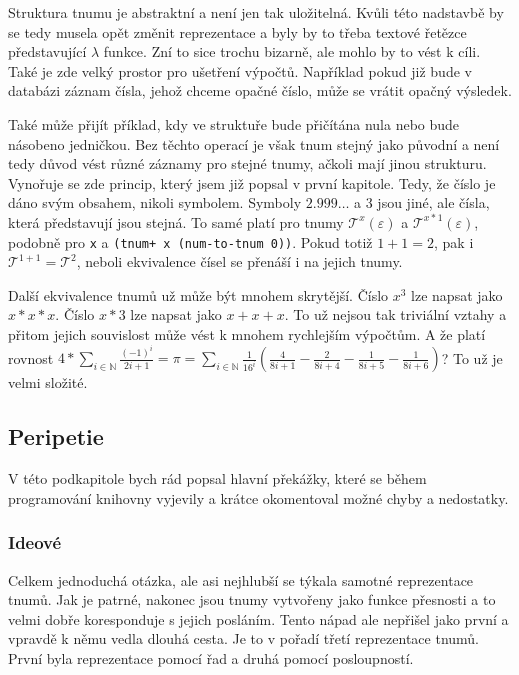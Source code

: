 Struktura tnumu je abstraktní a není jen tak uložitelná. Kvůli této nadstavbě by se tedy musela opět změnit reprezentace a byly by to třeba textové řetězce představující $\lambda$ funkce. Zní to sice trochu bizarně, ale mohlo by to vést k cíli. Také je zde velký prostor pro ušetření výpočtů. Například pokud již bude v databázi záznam čísla, jehož chceme opačné číslo, může se vrátit opačný výsledek.

Také může přijít příklad, kdy ve struktuře bude přičítána nula nebo bude násobeno jedničkou. Bez těchto operací je však tnum stejný jako původní a není tedy důvod vést různé záznamy pro stejné tnumy, ačkoli mají jinou strukturu. Vynořuje se zde princip, který jsem již popsal v první kapitole. Tedy, že číslo je dáno svým obsahem, nikoli symbolem. Symboly $2.999\ldots$ a $3$ jsou jiné, ale čísla, která představují jsou stejná. To samé platí pro tnumy $\mathcal{T}^x(\varepsilon)$ a $\mathcal{T}^{x*1}(\varepsilon)$, podobně pro \texttt{x} a \texttt{(tnum+ x (num-to-tnum 0))}. Pokud totiž $1+1=2$, pak i $\mathcal{T}^{1+1}=\mathcal{T}^{2}$, neboli ekvivalence čísel se přenáší i na jejich tnumy.

Další ekvivalence tnumů už může být mnohem skrytější. Číslo $x^3$ lze napsat jako $x*x*x$. Číslo $x*3$ lze napsat jako $x+x+x$. To už nejsou tak triviální vztahy a přitom jejich souvislost může vést k mnohem rychlejším výpočtům. A že platí rovnost $4*\sum_{i\in\mathbb{N}}\frac{(-1)^i}{2i+1}=\pi=\sum_{i\in\mathbb{N}}\frac{1}{16^i}(\frac{4}{8i+1}-\frac{2}{8i+4}-\frac{1}{8i+5}-\frac{1}{8i+6})$? To už je velmi složité.

\subsection{Peripetie}
V této podkapitole bych rád popsal hlavní překážky, které se během programování knihovny vyjevily a krátce okomentoval možné chyby a nedostatky.
\subsubsection{Ideové}\label{sss:ideoveperip}
Celkem jednoduchá otázka, ale asi nejhlubší se týkala samotné reprezentace tnumů. Jak je patrné, nakonec jsou tnumy vytvořeny jako funkce přesnosti a to velmi dobře koresponduje s jejich posláním. Tento nápad ale nepřišel jako první a vpravdě k němu vedla dlouhá cesta. Je to v pořadí třetí reprezentace tnumů. První byla reprezentace pomocí řad a druhá pomocí posloupností.

